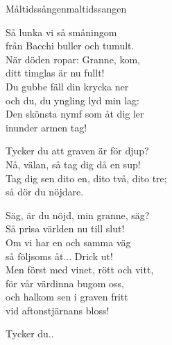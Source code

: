 \begin{song}{Måltidssången}{maltidssangen}
    \begin{vers}
        Så lunka vi så småningom\\
        från Bacchi buller och tumult.\\
        När döden ropar: Granne, kom,\\
        ditt timglas är nu fullt!\\
        Du gubbe fäll din krycka ner\\
        och du, du yngling lyd min lag:\\
        Den skönsta nymf som åt dig ler\\
        inunder armen tag!\\
    \newp
    \end{vers}
    \begin{vers}
        Tycker du att graven är för djup?\\
        Nå, välan, så tag dig då en sup!\\
        Tag dig sen dito en, dito två, dito tre;\\
        så dör du nöjdare.\\
    \end{vers}
    \newp
    \begin{vers}
        Säg, är du nöjd, min granne, säg?\\
        Så prisa världen nu till slut!\\
        Om vi har en och samma väg\\
        så följsoms åt... Drick ut!\\
        Men först med vinet, rött och vitt,\\
        för vår värdinna bugom oss,\\
        och halkom sen i graven fritt\\
        vid aftonstjärnans bloss!\\
    \end{vers}
    \newp
    \begin{vers}        
        Tycker du..
    \end{vers}
    \end{song}
    
